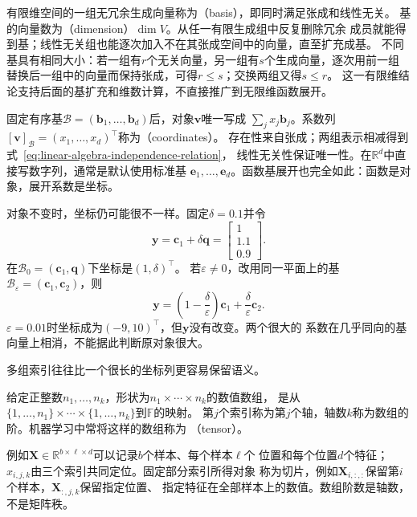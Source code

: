 有限维空间的一组无冗余生成向量称为（basis），即同时满足张成和线性无关。
基的向量数为（dimension）$\dim V$。从任一有限生成组中反复删除冗余
成员就能得到基；线性无关组也能逐次加入不在其张成空间中的向量，直至扩充成基。
不同基具有相同大小：若一组有$r$个无关向量，另一组有$s$个生成向量，逐次用前一组
替换后一组中的向量而保持张成，可得$r\leq s$；交换两组又得$s\leq r$。
这一有限维结论支持后面的基扩充和维数计算，不直接推广到无限维函数展开。


固定有序基$\mathcal B=(\bm b_1,\ldots,\bm b_d)$后，对象$\bm v$唯一写成
$\sum_j x_j\bm b_j$。系数列
$[\bm v]_{\mathcal B}=(x_1,\ldots,x_d)^{\top}$称为（coordinates）。
存在性来自张成；两组表示相减得到式~\eqref{eq:linear-algebra-independence-relation}，
线性无关性保证唯一性。在$\mathbb R^d$中直接写数字列，通常是默认使用标准基
$\bm e_1,\ldots,\bm e_d$。函数基展开也完全如此：函数是对象，展开系数是坐标。

对象不变时，坐标仍可能很不一样。固定$\delta=0.1$并令
\begin{equation}
 \bm y=\bm c_1+\delta\bm q=\begin{bmatrix}1\\1.1\\0.9\end{bmatrix}.
 \label{eq:linear-algebra-nearly-collinear-target}
\end{equation}
在$\mathcal B_0=(\bm c_1,\bm q)$下坐标是$(1,\delta)^{\top}$。
若$\varepsilon\neq0$，改用同一平面上的基
$\mathcal B_\varepsilon=(\bm c_1,\bm c_2)$，则
\begin{equation}
 \bm y=\left(1-\frac{\delta}{\varepsilon}\right)\bm c_1
       +\frac{\delta}{\varepsilon}\bm c_2.
 \label{eq:linear-algebra-coordinate-instability}
\end{equation}
$\varepsilon=0.01$时坐标成为$(-9,10)^{\top}$，但$\bm y$没有改变。两个很大的
系数在几乎同向的基向量上相消，不能据此判断原对象很大。


多组索引往往比一个很长的坐标列更容易保留语义。
\begin{definition}[多维数值数组]
\label{def:linear-algebra-multidimensional-array}
给定正整数$n_1,\ldots,n_k$，形状为$n_1\times\cdots\times n_k$的数值数组，
是从$\{1,\ldots,n_1\}\times\cdots\times\{1,\ldots,n_k\}$到$\mathbb F$的映射。
第$j$个索引称为第$j$个轴，轴数$k$称为数组的阶。机器学习中常将这样的数组称为
（tensor）。
\end{definition}
例如$\bm X\in\mathbb R^{b\times\ell\times d}$可以记录$b$个样本、每个样本$\ell$个
位置和每个位置$d$个特征；$x_{i,j,k}$由三个索引共同定位。固定部分索引所得对象
称为切片，例如$\bm X_{i,:,:}$保留第$i$个样本，$\bm X_{:,j,k}$保留指定位置、
指定特征在全部样本上的数值。数组阶数是轴数，不是矩阵秩。



